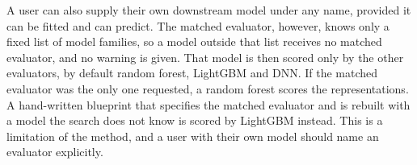A user can also supply their own downstream model under any name, provided it can be fitted and can predict. The matched evaluator, however, knows only a fixed list of model families, so a model outside that list receives no matched evaluator, and no warning is given. That model is then scored only by the other evaluators, by default random forest, LightGBM and DNN. If the matched evaluator was the only one requested, a random forest scores the representations. A hand-written blueprint that specifies the matched evaluator and is rebuilt with a model the search does not know is scored by LightGBM instead. This is a limitation of the method, and a user with their own model should name an evaluator explicitly.

